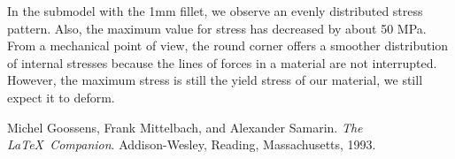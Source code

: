 \documentclass[12pt]{article}
\begin{document}
In the submodel with the 1mm fillet, we observe an evenly distributed stress pattern. Also,
the maximum value for stress has decreased by about 50 MPa. From a mechanical point of view, 
the round corner offers a smoother distribution of internal stresses because the lines of 
forces in a material are not interrupted. However, the maximum stress is still the yield 
stress of our material, we still expect it to deform.

\pagebreak
\begin{thebibliography}{9}
  Michel Goossens, Frank Mittelbach, and Alexander Samarin. 
  \textit{The \LaTeX\ Companion}. 
  Addison-Wesley, Reading, Massachusetts, 1993.
\end{thebibliography}
\end{document}
